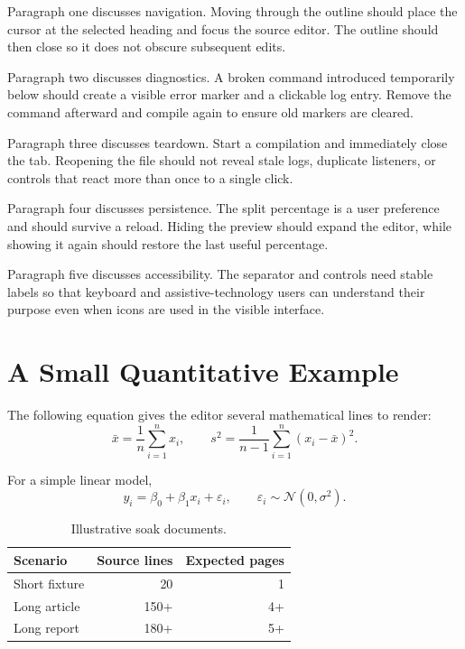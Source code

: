 \documentclass[11pt]{article}
\begin{document}
Paragraph one discusses navigation. Moving through the outline should place the
cursor at the selected heading and focus the source editor. The outline should
then close so it does not obscure subsequent edits.

Paragraph two discusses diagnostics. A broken command introduced temporarily
below should create a visible error marker and a clickable log entry. Remove the
command afterward and compile again to ensure old markers are cleared.

Paragraph three discusses teardown. Start a compilation and immediately close
the tab. Reopening the file should not reveal stale logs, duplicate listeners,
or controls that react more than once to a single click.

Paragraph four discusses persistence. The split percentage is a user preference
and should survive a reload. Hiding the preview should expand the editor, while
showing it again should restore the last useful percentage.

Paragraph five discusses accessibility. The separator and controls need stable
labels so that keyboard and assistive-technology users can understand their
purpose even when icons are used in the visible interface.

\section{A Small Quantitative Example}
The following equation gives the editor several mathematical lines to render:
\begin{equation}
  \bar{x} = \frac{1}{n}\sum_{i=1}^{n}x_i,
  \qquad
  s^2 = \frac{1}{n-1}\sum_{i=1}^{n}(x_i-\bar{x})^2.
\end{equation}

For a simple linear model,
\begin{equation}
  y_i = \beta_0 + \beta_1 x_i + \varepsilon_i,
  \qquad \varepsilon_i \sim \mathcal{N}(0,\sigma^2).
\end{equation}

\begin{table}[h]
\centering
\begin{tabular}{lrr}
\toprule
Scenario & Source lines & Expected pages \\
\midrule
Short fixture & 20 & 1 \\
Long article & 150+ & 4+ \\
Long report & 180+ & 5+ \\
\bottomrule
\end{tabular}
\caption{Illustrative soak documents.}
\end{table}
\end{document}
